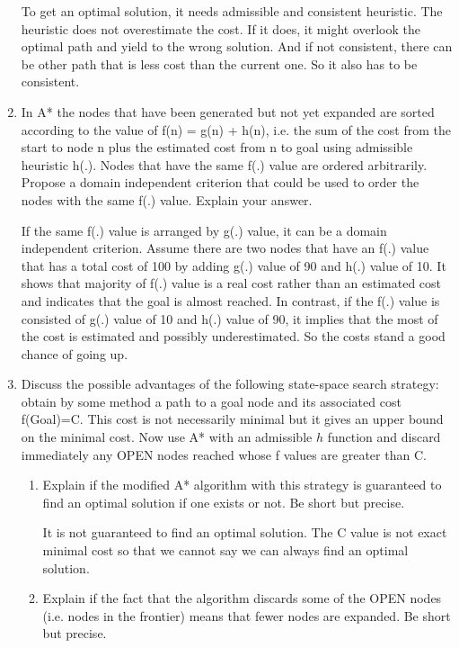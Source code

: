 \documentclass[12pt]{article}
\begin{document}
\begin{enumerate}
	To get an optimal solution, it needs admissible and consistent heuristic. The heuristic does not overestimate the cost. If it does, it might overlook the optimal path and yield to the wrong solution. And if not consistent, there can be other path that is less cost than the current one. So it also has to be consistent.

\item In A* the nodes that have been generated but not yet expanded are sorted according to the value of f(n) = g(n) + h(n), i.e. the sum of the cost from the start to node n plus the estimated cost from n to goal using admissible heuristic h(.). Nodes that have the same f(.) value are ordered arbitrarily. 
Propose a domain independent criterion that could be used to order the nodes with the same f(.) value. Explain your answer. \par
	
    If the same f(.) value is arranged by g(.) value, it can be a domain independent criterion. Assume there are two nodes that have an f(.) value that has a total cost of 100 by adding g(.) value of 90 and h(.) value of 10. It shows that majority of f(.) value is a real cost rather than an estimated cost and indicates that the goal is almost reached. In contrast, if the f(.) value is consisted of g(.) value of 10 and h(.) value of 90, it implies that the most of the cost is estimated and possibly underestimated. So the costs stand a good chance of going up.  
    
\item Discuss the possible advantages of the following state-space search strategy: obtain by some method a path to a goal node and its associated cost f(Goal)=C. This cost is not necessarily minimal but it gives an upper bound on the minimal cost. Now use A* with an admissible $h$ function and discard immediately any OPEN nodes reached whose f values are greater than C.
  \begin{enumerate}
  \item Explain if the modified A* algorithm with this strategy is guaranteed to find an optimal solution if one exists or not. Be short but precise. \par
  
  It is not guaranteed to find an optimal solution. The C value is not exact minimal cost so that we cannot say we can always find an optimal solution.
  
  \item Explain if the fact that the algorithm discards some of the OPEN nodes (i.e. nodes in the frontier) means that fewer nodes are expanded. Be short but precise. \par
  

\end{enumerate}
\end{enumerate}
\end{document}
